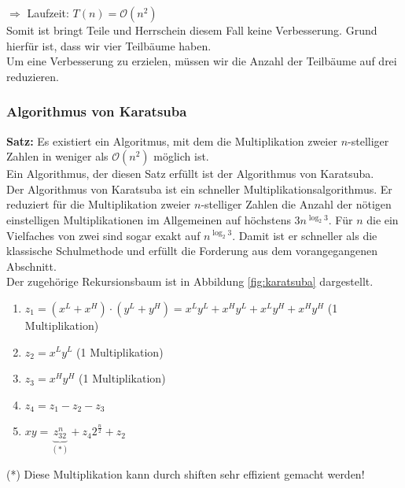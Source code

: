 $\Rightarrow$ Laufzeit: $T(n)=\mathcal{O}(n^2)$\\
Somit ist bringt \glqq Teile und Herrsche\grqq in diesem Fall keine Verbesserung. Grund hierfür ist, dass wir vier Teilbäume haben.\\
Um eine Verbesserung zu erzielen, müssen wir die Anzahl der Teilbäume auf drei reduzieren.

\subsubsection*{Algorithmus von Karatsuba}
\textbf{Satz:} Es existiert ein Algoritmus, mit dem die Multiplikation zweier $n$-stelliger Zahlen in weniger als $\mathcal{O}(n^2)$ möglich ist.\\
Ein Algorithmus, der diesen Satz erfüllt ist der Algorithmus von Karatsuba.\\
Der Algorithmus von Karatsuba ist ein schneller Multiplikationsalgorithmus. Er reduziert für die Multiplikation zweier $n$-stelliger Zahlen die Anzahl der nötigen einstelligen Multiplikationen im Allgemeinen auf höchstens $3n^{\log_2 3}$. Für $n$ die ein Vielfaches von zwei sind sogar exakt auf $n^{\log_2 3}$. Damit ist er schneller als die klassische Schulmethode und erfüllt die Forderung aus dem vorangegangenen Abschnitt.\\
Der zugehörige Rekursionsbaum ist in Abbildung \ref{fig:karatsuba} dargestellt.\\
\begin{enumerate}
    \item $z_1 = (x^L+x^H)\cdot (y^L+y^H)= x^Ly^L+x^Hy^L+x^Ly^H+x^Hy^H$ (1 Multiplikation)
\item $z_2 = x^Ly^L$ (1 Multiplikation)
\item $z_3 = x^Hy^H$ (1 Multiplikation)
\item $z_4 = z_1- z_2 - z_3$
\item $xy= \underbrace{z_32^n}_{(*)}+z_4 2^{\frac{n}{2}}+z_2$
\end{enumerate}

(*) Diese Multiplikation kann durch shiften sehr effizient gemacht werden!

